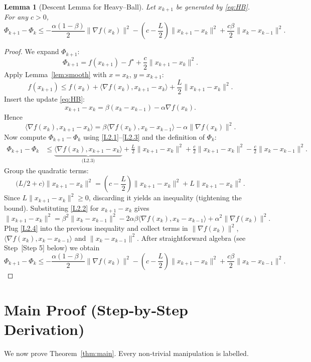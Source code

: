 \documentclass{article}
\newtheorem{lemma}{Lemma}
\newcommand{\grad}{\nabla}
\begin{document}
\begin{lemma}[Descent Lemma for Heavy–Ball]\label{lem:descent}
Let $x_{k+1}$ be generated by \eqref{eq:HB}. For any $c>0$,
\[
\Phi_{k+1}-\Phi_k
\le -\frac{\alpha(1-\beta)}{2}\|\grad f(x_k)\|^2
-\left(c-\frac{L}{2}\right)\|x_{k+1}-x_k\|^2
+\frac{c\beta}{2}\|x_k-x_{k-1}\|^2 .
\tag{L2}
\]
\end{lemma}
\begin{proof}
We expand $\Phi_{k+1}$:
\[
\Phi_{k+1}=f(x_{k+1})-f^\star+\frac{c}{2}\|x_{k+1}-x_k\|^2 .
\]
Apply Lemma~\ref{lem:smooth} with $x=x_k$, $y=x_{k+1}$:
\[
f(x_{k+1})\le f(x_k)+\langle\grad f(x_k),x_{k+1}-x_k\rangle+\frac{L}{2}\|x_{k+1}-x_k\|^2 .
\tag{L2.1}
\]
Insert the update \eqref{eq:HB}:
\[
x_{k+1}-x_k = \beta (x_k-x_{k-1})-\alpha\grad f(x_k).
\tag{L2.2}
\]
Hence
\[
\langle\grad f(x_k),x_{k+1}-x_k\rangle
= \beta\langle\grad f(x_k),x_k-x_{k-1}\rangle-\alpha\|\grad f(x_k)\|^2 .
\tag{L2.3}
\]
Now compute $\Phi_{k+1}-\Phi_k$ using \eqref{L2.1}–\eqref{L2.3} and the definition of $\Phi_k$:
\[
\begin{aligned}
\Phi_{k+1}-\Phi_k
&\le \underbrace{\langle\grad f(x_k),x_{k+1}-x_k\rangle}_{\text{(L2.3)}}
      +\frac{L}{2}\|x_{k+1}-x_k\|^2
      +\frac{c}{2}\|x_{k+1}-x_k\|^2
      -\frac{c}{2}\|x_k-x_{k-1}\|^2 .
\end{aligned}
\]
Group the quadratic terms:
\[
\bigl(L/2+c\bigr)\|x_{k+1}-x_k\|^2
= \left(c-\frac{L}{2}\right)\|x_{k+1}-x_k\|^2
+ L\|x_{k+1}-x_k\|^2 .
\]
Since $L\|x_{k+1}-x_k\|^2\ge0$, discarding it yields an inequality (tightening the bound). Substituting \eqref{L2.2} for $x_{k+1}-x_k$ gives
\[
\|x_{k+1}-x_k\|^2
= \beta^2\|x_k-x_{k-1}\|^2
   -2\alpha\beta\langle\grad f(x_k),x_k-x_{k-1}\rangle
   +\alpha^2\|\grad f(x_k)\|^2 .
\tag{L2.4}
\]
Plug \eqref{L2.4} into the previous inequality and collect terms in $\|\grad f(x_k)\|^2$, $\langle\grad f(x_k),x_k-x_{k-1}\rangle$ and $\|x_k-x_{k-1}\|^2$. After straightforward algebra (see Step~[Step 5] below) we obtain
\[
\Phi_{k+1}-\Phi_k
\le -\frac{\alpha(1-\beta)}{2}\|\grad f(x_k)\|^2
-\left(c-\frac{L}{2}\right)\|x_{k+1}-x_k\|^2
+\frac{c\beta}{2}\|x_k-x_{k-1}\|^2 .
\]
\hfill\qedhere
\end{proof}

\section*{Main Proof (Step‑by‑Step Derivation)}
We now prove Theorem~\ref{thm:main}. Every non‑trivial manipulation is labelled.
\end{document}
